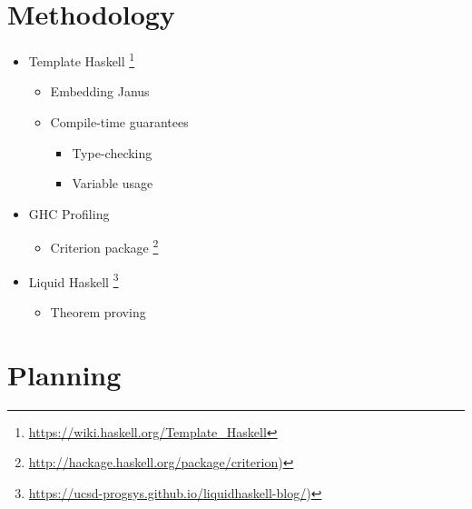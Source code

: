 \documentclass[12pt,a4paper]{article}
\begin{document}
\section{Methodology}
\begin{itemize}
	\item{Template Haskell \footnote{\url{https://wiki.haskell.org/Template_Haskell}}}
	\begin{itemize}
		\item{Embedding Janus}
		\item{Compile-time guarantees}
		\begin{itemize}
			\item{Type-checking}
			\item{Variable usage}
		\end{itemize}
		
	\end{itemize}
	
	\item{GHC Profiling}
	\begin{itemize}
		\item{Criterion package \footnote{\url{http://hackage.haskell.org/package/criterion})}}
	\end{itemize}
	
	\item{Liquid Haskell \footnote{\url{https://ucsd-progsys.github.io/liquidhaskell-blog/})}}
	\begin{itemize}
		\item{Theorem proving}
	\end{itemize}
\end{itemize}

\section{Planning}
\end{document}
